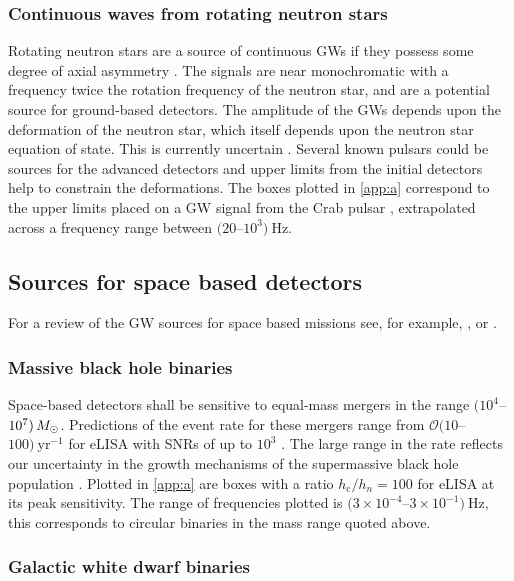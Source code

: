 \subsubsection{Continuous waves from rotating neutron stars}

Rotating neutron stars are a source of continuous GWs if they possess some degree of axial asymmetry \citep{Abbott2007, Prix2009, Einstein@Home}. The signals are near monochromatic with a frequency twice the rotation frequency of the neutron star, and are a potential source for ground-based detectors. The amplitude of the GWs depends upon the deformation of the neutron star, which itself depends upon the neutron star equation of state. This is currently uncertain \citep{Lattimer2012}. Several known pulsars could be sources for the advanced detectors and upper limits from the initial detectors help to constrain the deformations. The boxes plotted in \ref{app:a} correspond to the upper limits placed on a GW signal from the Crab pulsar \citep{Aasi2014a}, extrapolated across a frequency range between $(20$--$10^{3})~\mathrm{Hz}$.

\subsection{Sources for space based detectors}

For a review of the GW sources for space based missions see, for example, \citet{Amaro-Seoane-et-al}, \citet{Gairetal} or \citet{eLISAyellowbook}.


\subsubsection{Massive black hole binaries}

Space-based detectors shall be sensitive to equal-mass mergers in the range $(10^{4}$--$10^{7})\,M_{ \odot }$. Predictions of the event rate for these mergers range from ${\mathcal{O}}(10$--$100)~\mathrm{yr}^{-1}$ for eLISA with SNRs of up to $10^3$ \citep{TheGravitationalUniverse}. The large range in the rate reflects our uncertainty in the growth mechanisms of the supermassive black hole population \citep{Volonteri2010}. Plotted in \ref{app:a} are boxes with a ratio $h_\mathrm{c}/h_{n}=100$ for eLISA at its peak sensitivity. The range of frequencies plotted is $(3\times 10^{-4}$--$3\times 10^{-1})~\mathrm{Hz}$, this corresponds to circular binaries in the mass range quoted above.

\subsubsection{Galactic white dwarf binaries} \label{sec:GB}

